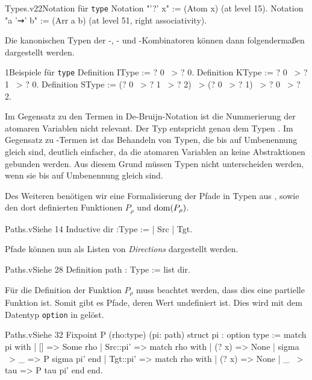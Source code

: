 \begin{ccode}[typenot]{Types.v}{}{22}{Notation für \texttt{type}}
Notation "'?' x" := (Atom x) (at level 15).
Notation "a '⇝' b" := (Arr a b) 
  (at level 51, right associativity).
\end{ccode}
Die kanonischen Typen der \tS-, \tK{}- und \tI-Kombinatoren können dann folgendermaßen dargestellt werden.
\begin{ccode}[skitype]{}{}{1}{Beispiele für \texttt{type}}
Definition IType := ? 0 ~> ? 0.
Definition KType := ? 0 ~> ? 1 ~> ? 0.
Definition SType := 
    (? 0 ~> ? 1 ~> ? 2) ~> (? 0 ~> ? 1) ~> ? 0 ~> ? 2.
\end{ccode}
\begin{remark}
    Im Gegensatz zu den Termen in De-Bruijn-Notation ist die Nummerierung der atomaren Variablen nicht relevant. Der Typ  entspricht genau dem Typen . Im Gegensatz zu \tlambda-Termen ist das Behandeln von Typen, die bis auf Umbenennung gleich sind, deutlich einfacher, da die atomaren Variablen an keine Abstraktionen gebunden werden. Aus diesem Grund müssen Typen nicht unterscheiden werden, wenn sie bis auf Umbenennung gleich sind.
\end{remark}

Des Weiteren benötigen wir eine Formalisierung der Pfade in Typen aus , sowie den dort definierten Funktionen $P_\rho$ und $\text{dom}(P_\rho)$. 
\begin{code}[dir]{Paths.v}{Siehe }{14}
Inductive dir :Type :=
  | Src
  | Tgt.
\end{code}

Pfade können nun als Listen von \emph{Directions} dargestellt werden.
\begin{code}[path]{Paths.v}{Siehe }{28}
Definition path : Type := list dir.
\end{code}

Für die Definition der Funktion $P_\rho$ muss beachtet werden, dass dies eine partielle Funktion ist. Somit gibt es Pfade, deren Wert undefiniert ist. Dies wird mit dem Datentyp \texttt{option} in  gelöst.
\begin{code}[P]{Paths.v}{Siehe }{32}
Fixpoint P (rho:type) (pi: path) {struct pi} : option type :=
  match pi with
  | [] => Some rho
  | Src::pi' => match rho with
                | (? x) => None
                | sigma ~> _ => P sigma pi'
                end
  | Tgt::pi' => match rho with
                | (? x) => None
                | _ ~> tau => P tau pi'
                end
  end.
\end{code}

